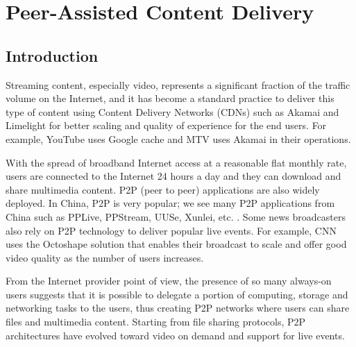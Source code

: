 \chapter{Peer-Assisted Content Delivery}

\section{Introduction}

Streaming content, especially video, represents a significant fraction of the traffic volume on the Internet, and it has become a standard practice to deliver this type of content using Content Delivery Networks (CDNs) such as Akamai and Limelight for better scaling and quality of experience for the end users. 
For example, YouTube uses Google cache and MTV uses Akamai in their operations.

With the spread of broadband Internet access at a reasonable flat monthly rate, users are connected to the Internet 24 hours a day and they can download and share multimedia content. P2P (peer to peer) applications are also widely deployed. 
In China, P2P is very popular; we see many P2P applications from China such as PPLive, PPStream, UUSe, Xunlei, etc. \cite{Vu:2010:UOC:1865106.1865115}. 
Some news broadcasters also rely on P2P technology to deliver popular live events. 
For example, CNN uses the Octoshape \cite{octoshape} solution that enables their broadcast to scale and offer good video quality as the number of users increases.

From the Internet provider point of view, the presence of so many always-on users suggests that it is possible to delegate a portion of computing, storage and networking tasks to the users, thus creating P2P networks where users can share files and multimedia content. 
Starting from file sharing protocols, P2P architectures have evolved toward video on demand and support for live events.


